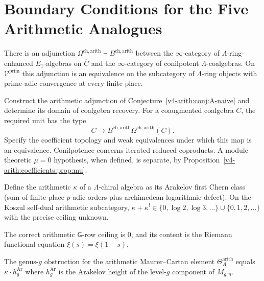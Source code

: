 \section{Boundary Conditions for the Five Arithmetic Analogues}
\label{v4-arith:construction:theorems-naive}

\begin{conjecture}
\label{v4-arith:conj:A-naive}
There is an adjunction
\(\Omega^{\mathrm{ch,arith}}\dashv B^{\mathrm{ch,arith}}\) between
the \(\infty\)-category of \(\Lambda\)-ring-enhanced \(E_{1}\)-algebras
on \(\overline{C}\) and the \(\infty\)-category of conilpotent
\(\Lambda\)-coalgebras. On \(\mathcal{V}^{\mathrm{prim}}\) this
adjunction is an equivalence on the subcategory of \(\Lambda\)-ring
objects with prime-adic convergence at every finite place.
\end{conjecture}

\begin{question}
\label{v4-arith:conj:B-naive}
Construct the arithmetic adjunction of
Conjecture~\ref{v4-arith:conj:A-naive} and determine its domain of
coalgebra recovery. For a coaugmented coalgebra \(C\), the required
unit has the type
\[
 C\longrightarrow
 B^{\mathrm{ch,arith}}\Omega^{\mathrm{ch,arith}}(C).
\]
Specify the coefficient topology and weak equivalences under which
this map is an equivalence. Conilpotence concerns iterated reduced
coproducts. A module-theoretic \(\mu=0\) hypothesis, when defined,
is separate, by Proposition~\ref{v4-arith:coefficients:prop:mu}.
\end{question}

\begin{conjecture}
\label{v4-arith:conj:C-naive}
Define the arithmetic \(\kappa\) of a \(\Lambda\)-chiral algebra as
its Arakelov first Chern class (sum of finite-place \(p\)-adic
orders plus archimedean logarithmic defect). On the Koszul
self-dual arithmetic subcategory,
\(\kappa+\kappa^{!}\in\{0,\log 2,\log 3,\ldots\}\cup\{0,1,2,\ldots\}\)
with the precise ceiling unknown.
\end{conjecture}

\begin{warning}
The correct arithmetic \(\mathsf{G}\)-row ceiling is \(0\), and its
content is the Riemann functional equation
\(\xi(s)=\xi(1-s)\).
\end{warning}

\begin{conjecture}
\label{v4-arith:conj:D-naive}
The genus-\(g\) obstruction for the arithmetic Maurer--Cartan element
\(\Theta_{A}^{\mathrm{arith}}\) equals \(\kappa\cdot h_{g}^{\mathrm{Ar}}\)
where \(h_{g}^{\mathrm{Ar}}\) is the Arakelov height of the level-\(g\)
component of \(\overline{M}_{g,n}\).
\end{conjecture}

